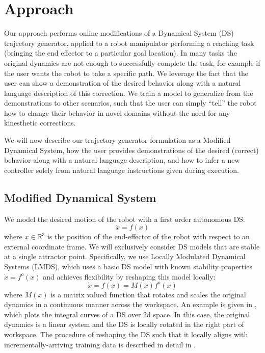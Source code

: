 
\section{Approach}
\label{sec:approach}

Our approach performs online modifications of a Dynamical System (DS) trajectory generator, applied to a robot manipulator performing a reaching task (bringing the end effector to a particular goal location).
In many tasks the original dynamics are not enough to successfully complete the task, for example if the user wants the robot to take a specific path.
We leverage the fact that the user can show a demonstration of the desired behavior along with a natural language description of this correction.
We train a model to generalize from the demonstrations to other scenarios, such that the user can simply ``tell'' the robot how to change their behavior in novel domains without the need for any kinesthetic corrections.

We will now describe our trajectory generator formulation as a Modified Dynamical System, how the user provides demonstrations of the desired (correct) behavior along with a natural language description, and how to infer a new controller solely from natural language instructions given during execution.

\subsection{Modified Dynamical System}

We model the desired motion of the robot with a first order autonomous DS:
\begin{equation}
  \label{eq:DS_general}
  \dot x = f(x)
\end{equation}
where $x \in \mathbb{R}^3$ is the position of the end-effector of the robot with respect to an external coordinate frame.
We will exclusively consider DS models that are stable at a single attractor point.
Specifically, we use Locally Modulated Dynamical Systems (LMDS), which uses a basic DS model with known stability properties $\dot x = f^o(x)$ and achieves flexibility by reshaping this model locally:
\begin{equation}
  \label{eq:DS_reshaped}
  \dot x = f(x) = M(x)f^o(x)
\end{equation}
where $M(x)$ is a matrix valued function that rotates and scales the original dynamics in a continuous manner across the workspace.
An example is given in , which plots the integral curves of a DS over 2d space.
In this case, the original dynamics is a linear system and the DS is locally rotated in the right part of workspace.
The procedure of reshaping the DS such that it locally aligns with incrementally-arriving training data is described in detail in .


